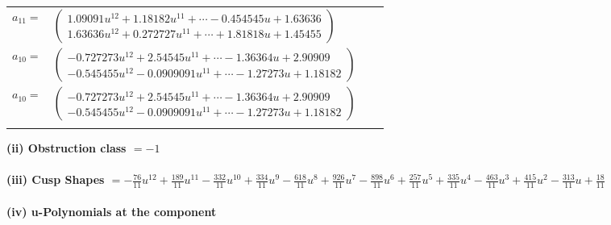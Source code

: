 \documentclass[1p]{elsarticle_modified}
\theoremstyle{definition}
\begin{document}
\begin{tabular}{m{7pt} m{180pt} m{7pt} m{180pt} }
\flushright $a_{11}=$&$\begin{pmatrix}1.09091 u^{12}+1.18182 u^{11}+\cdots-0.454545 u+1.63636\\1.63636 u^{12}+0.272727 u^{11}+\cdots+1.81818 u+1.45455\end{pmatrix}$ \\
\flushright $a_{10}=$&$\begin{pmatrix}-0.727273 u^{12}+2.54545 u^{11}+\cdots-1.36364 u+2.90909\\-0.545455 u^{12}-0.0909091 u^{11}+\cdots-1.27273 u+1.18182\end{pmatrix}$\\ \flushright $a_{10}=$&$\begin{pmatrix}-0.727273 u^{12}+2.54545 u^{11}+\cdots-1.36364 u+2.90909\\-0.545455 u^{12}-0.0909091 u^{11}+\cdots-1.27273 u+1.18182\end{pmatrix}$\\&\end{tabular}
\flushleft \textbf{(ii) Obstruction class $= -1$}\\~\\
\flushleft \textbf{(iii) Cusp Shapes $= -\frac{76}{11} u^{12}+\frac{189}{11} u^{11}-\frac{332}{11} u^{10}+\frac{334}{11} u^9-\frac{618}{11} u^8+\frac{926}{11} u^7-\frac{898}{11} u^6+\frac{257}{11} u^5+\frac{335}{11} u^4-\frac{463}{11} u^3+\frac{415}{11} u^2-\frac{313}{11} u+\frac{18}{11}$}\\~\\
\newpage\renewcommand{\arraystretch}{1}
\flushleft \textbf{(iv) u-Polynomials at the component}\newline \\
\end{document}
